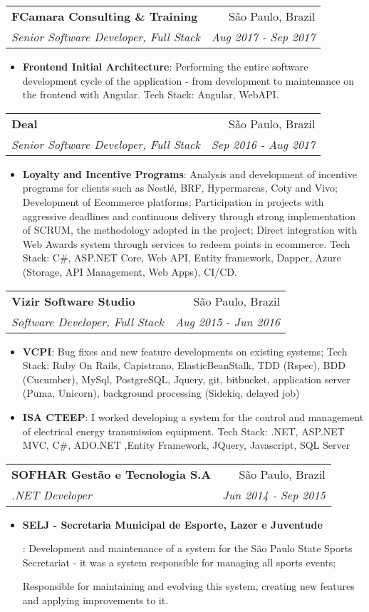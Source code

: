 \documentclass[letterpaper,11pt]{article}
\makeatletter
\newcommand{\resumeItem}[2]{
  \item\small{
    \textbf{#1}{: #2 \vspace{-2pt}}
  }
}
\newcommand{\resumeSubheading}[4]{
  \vspace{-1pt}\item
    \begin{tabular*}{0.97\textwidth}[t]{l@{\extracolsep{\fill}}r}
      \textbf{#1} & #2 \\
      \textit{\small#3} & \textit{\small #4} \\
    \end{tabular*}\vspace{-5pt}
}
\newcommand{\resumeSubSubheading}[2]{
    \begin{tabular*}{0.97\textwidth}{l@{\extracolsep{\fill}}r}
      \textit{\small#1} & \textit{\small #2} \\
    \end{tabular*}\vspace{-5pt}
}
\newcommand{\resumeSubHeadingListEnd}{\end{itemize}}
\newcommand{\resumeItemListStart}{\begin{itemize}}
\newcommand{\resumeItemListEnd}{\end{itemize}\vspace{-5pt}}
\makeatother
\begin{document}
    \resumeSubheading
    {FCamara Consulting \& Training}{São Paulo, Brazil}
    {Senior Software Developer, Full Stack}{Aug 2017 - Sep 2017}
    \resumeItemListStart
      \resumeItem{Frontend Initial Architecture}
        {Performing the entire software development cycle of the application - from development to maintenance on the frontend with Angular. Tech Stack: Angular, WebAPI.}
    \resumeItemListEnd


    \resumeSubheading
    {Deal}{São Paulo, Brazil}
    {Senior Software Developer, Full Stack}{Sep 2016 - Aug 2017}
    \resumeItemListStart
      \resumeItem{Loyalty and Incentive Programs}
        {Analysis and development of incentive programs for clients such as Nestlé, BRF, Hypermarcas, Coty and Vivo;
        Development of Ecommerce platforms;
        Participation in projects with aggressive deadlines and continuous delivery through strong implementation of SCRUM, the methodology adopted in the project;
        Direct integration with Web Awards system through services to redeem points in ecommerce.
        Tech Stack: C\#, ASP.NET Core, Web API, Entity framework, Dapper, Azure (Storage, API Management, Web Apps), CI/CD.}
    \resumeItemListEnd

    \resumeSubheading
      {Vizir Software Studio}{São Paulo, Brazil}
      {Software Developer, Full Stack}{Aug 2015 - Jun 2016}
      \resumeItemListStart
        \resumeItem{VCPI}
          {Bug fixes and new feature developments on existing systems; Tech Stack: Ruby On Rails, Capistrano, ElasticBeanStalk, TDD
          (Rspec), BDD (Cucumber), MySql, PostgreSQL, Jquery, git, bitbucket, application server (Puma, Unicorn), background processing (Sidekiq, delayed job)}
        \resumeItem{ISA CTEEP}
          {I worked developing a system for the control and management of electrical energy transmission equipment. Tech Stack: .NET, ASP.NET MVC, C\#, ADO.NET ,Entity Framework, JQuery, Javascript, SQL Server}
      \resumeItemListEnd
      
    \resumeSubheading
    {SOFHAR Gestão e Tecnologia S.A}{São Paulo, Brazil}
    {.NET Developer}{Jun 2014 - Sep 2015}
    \resumeItemListStart
      \resumeItem{SELJ - Secretaria Municipal de Esporte, Lazer e Juventude}
        {Development and maintenance of a system for the São Paulo State Sports Secretariat - it was a system responsible for managing all sports events;

        Responsible for maintaining and evolving this system, creating new features and applying improvements to it.}
    \resumeItemListEnd
\end{document}
